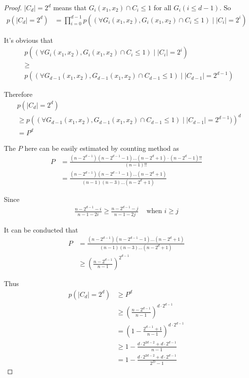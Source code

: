 \documentclass[10pt,a4paper]{article}
\begin{document}
		\begin{proof}
			$|C_d| = 2^d$ means that $G_i(x_1, x_2) \cap C_i \leq 1$
			for all $G_i(i \leq d-1)$. So
			\begin{align*}
				p(|C_d| = 2^d) &= \prod_{i=0}^{d-1} p\left((\forall G_i(x_1, x_2), G_i(x_1, x_2) \cap C_i \leq 1)
					 \; | \; |C_i| = 2^i\right)
			\end{align*}
			
			It's obvious that
			\begin{align*}
			&p\left((\forall G_i(x_1, x_2), G_i(x_1, x_2) \cap C_i \leq 1) \; | \; |C_i| = 2^i\right)\\
			&\geq \\
			&p\left((\forall G_{d-1}(x_1, x_2), G_{d-1}(x_1, x_2) \cap C_{d-1} \leq 1) \; | \; |C_{d-1}| = 2^{d-1}\right)
			\end{align*}
			
			Therefore
			\begin{align*}
				&p(|C_d| = 2^d) \\
				&\geq p\left((\forall G_{d-1}(x_1, x_2), G_{d-1}(x_1, x_2) 
					\cap C_{d-1} \leq 1) \; | \; |C_{d-1}| = 2^{d-1})\right)^d\\
				&= P^d
			\end{align*}
			
			The $P$ here can be easily estimated by counting method as
			\begin{align*}
				P &= \frac{(n-2^{d-1})(n-2^{d-1}-1)\ldots(n-2^d+1)\cdot (n-2^d-1)!!}{(n-1)!!}\\
					&= \frac{(n-2^{d-1})(n-2^{d-1}-1)\ldots (n-2^d+1)}{(n-1)(n-3)\ldots(n-2^d+1)}
			\end{align*}
			
			Since
			\begin{align*}
				\frac{n-2^{d-1}-i}{n-1-2i} \geq \frac{n-2^{d-1}-j}{n-1-2j} & \text{ when } i \geq j
			\end{align*}
			
			It can be conducted that
			\begin{align*}
				P &= \frac{(n-2^{d-1})(n-2^{d-1}-1)\ldots (n-2^d+1)}{(n-1)(n-3)\ldots(n-2^d+1)}\\
					&\geq (\frac{n-2^{d-1}}{n-1})^{2^{d-1}}
			\end{align*}
			
			Thus
			\begin{align*}
			p(|C_d| = 2^d) &\geq P^d\\
				&\geq (\frac{n-2^{d-1}}{n-1})^{d \cdot 2^{d-1}}\\
				&= (1-\frac{2^{d-1}+1}{n-1})^{d \cdot 2^{d-1}}\\
				&\geq 1-\frac{d \cdot 2^{2d-2}+d \cdot 2^{d-1}}{n-1}\\
				&= 1-\frac{d \cdot 2^{2d-2}+d \cdot 2^{d-1}}{2^D-1}
			\end{align*}
		\end{proof}
		
\end{document}

